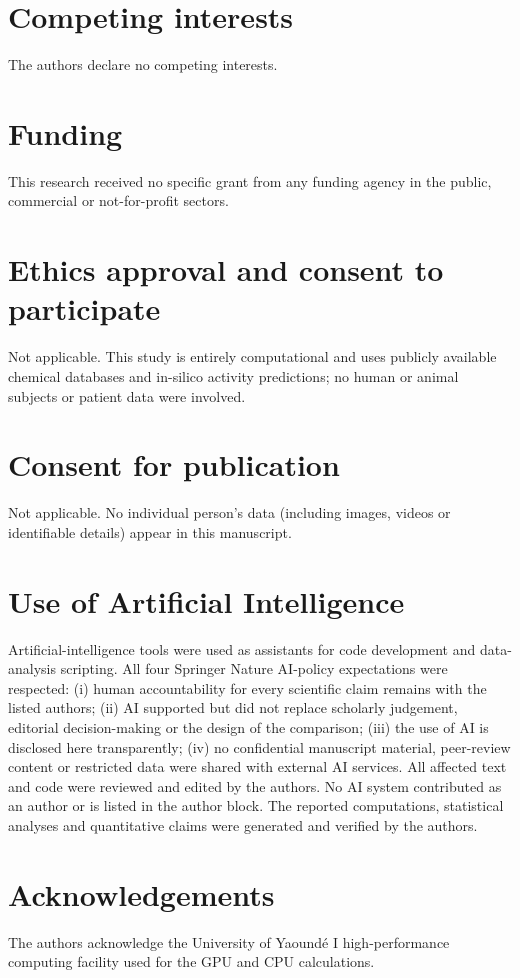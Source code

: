 \documentclass[11pt,a4paper]{article}
\begin{document}
\section*{Competing interests}

The authors declare no competing interests.

\section*{Funding}

This research received no specific grant from any funding agency in the public, commercial or not-for-profit sectors.

\section*{Ethics approval and consent to participate}

Not applicable. This study is entirely computational and uses publicly available chemical databases and in-silico activity predictions; no human or animal subjects or patient data were involved.

\section*{Consent for publication}

Not applicable. No individual person's data (including images, videos or identifiable details) appear in this manuscript.

\section*{Use of Artificial Intelligence}

Artificial-intelligence tools were used as assistants for code development and data-analysis scripting. All four Springer Nature AI-policy expectations were respected: (i) human accountability for every scientific claim remains with the listed authors; (ii) AI supported but did not replace scholarly judgement, editorial decision-making or the design of the comparison; (iii) the use of AI is disclosed here transparently; (iv) no confidential manuscript material, peer-review content or restricted data were shared with external AI services. All affected text and code were reviewed and edited by the authors. No AI system contributed as an author or is listed in the author block. The reported computations, statistical analyses and quantitative claims were generated and verified by the authors.

\section*{Acknowledgements}

The authors acknowledge the University of Yaound\'e I high-performance computing facility used for the GPU and CPU calculations.



\end{document}
